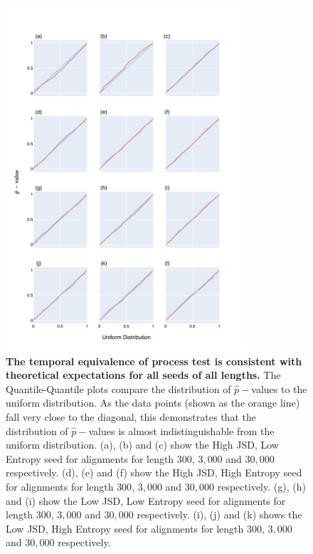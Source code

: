 \begin{figure}[!ht]
\centering
\includegraphics[width=0.8\textwidth]{figures/plots/synthetic/temp_eop/all_seeds.pdf}
\caption[The temporal equivalence of process test is consistent with theoretical expectations for all seeds of all lengths]{\textbf{The temporal equivalence of process test is consistent with theoretical expectations for all seeds of all lengths.} The Quantile-Quantile plots compare the distribution of $\hat p-$values to the uniform distribution. As the data points (shown as the orange line) fall very close to the diagonal, this demonstrates that the distribution of $\hat p-$values is almost indistinguishable from the uniform distribution. (a), (b) and (c) show the High JSD, Low Entropy seed for alignments for length $300$, $3,000$ and $30,000$ respectively. (d), (e) and (f) show the High JSD, High Entropy seed for alignments for length $300$, $3,000$ and $30,000$ respectively. (g), (h) and (i) show the Low JSD, Low Entropy seed for alignments for length $300$, $3,000$ and $30,000$ respectively. (i), (j) and (k) shows the Low JSD, High Entropy seed for alignments for length $300$, $3,000$ and $30,000$ respectively.}
\label{fig:synthetic/temp_eop/all_seeds}
\end{figure}